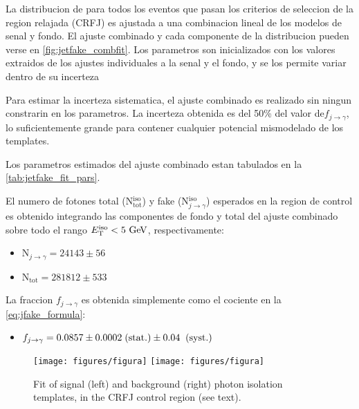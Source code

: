 La distribucion de {\etiso} para todos los eventos que pasan los criterios
de seleccion de la region relajada (CRFJ) es ajustada a una combinacion
lineal de los modelos de senal y fondo. El ajuste combinado y cada componente
de la distribucion pueden verse en {\fig} \ref{fig:jetfake_combfit}.
Los parametros son inicializados con los valores extraidos de los ajustes
individuales a la senal y el fondo, y se los permite variar dentro de su
incerteza

Para estimar la incerteza sistematica, el ajuste combinado es realizado
sin ningun constrarin en los parametros. La incerteza obtenida es del
50\% del valor de$f_{j\to\gamma}$, lo suficientemente grande para contener
cualquier potencial mismodelado de los templates.

Los parametros estimados del ajuste combinado estan tabulados en la
{\tab} \ref{tab:jetfake_fit_pars}.

El numero de fotones total (N$_\text{tot}^\text{iso}$) y fake (N$_{j\to\gamma}^\text{iso}$)
esperados en la region de control es obtenido integrando
las componentes de fondo y total del ajuste combinado sobre todo el rango
$\etiso<5\gev$, respectivamente:

\begin{itemize}
\item[] N$_{j\to\gamma}= 24143 \pm 56$

\item[] N$_\text{tot}= 281812 \pm 533$
\end{itemize}

La fraccion $f_{j\to \gamma}$ es obtenida simplemente como el cociente
en la {\eq} \eqref{eq:jfake_formula}:

\begin{itemize}
\item[] $f_{j\rightarrow\gamma} = 0.0857 \pm 0.0002 \mbox{$\;$(stat.)} \pm 0.04 \;\mbox{$\;$(syst.)}$
\end{itemize}

\begin{figure}[h]
  \begin{center}
  \texttt{[image: figures/figura]}  \hfill
  \texttt{[image: figures/figura]}
  \caption{Fit of signal (left) and background (right) photon isolation templates, in the CRFJ control region (see text).}
  \label{fig:jetfake_sigbkg}
  \end{center}
\end{figure}

